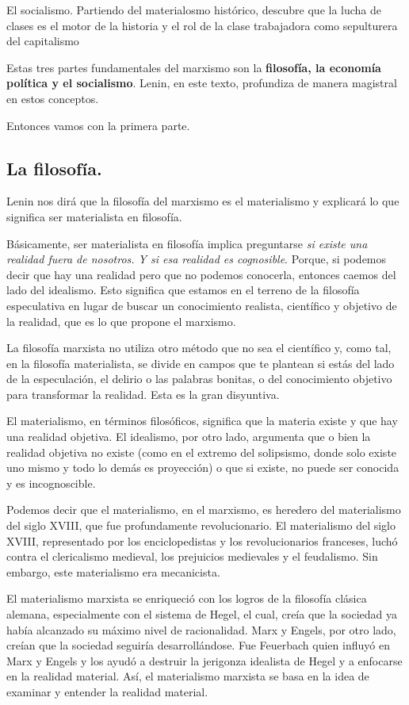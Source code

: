 \documentclass[
  jou,
  floatsintext,
  longtable,
  a4paper,
  nolmodern,
  notxfonts,
  notimes,
  12pt,
  colorlinks=true,linkcolor=blue,citecolor=blue,urlcolor=blue]{apa7}
\begin{document}
El socialismo. Partiendo del materialosmo histórico, descubre que la
lucha de clases es el motor de la historia y el rol de la clase
trabajadora como sepulturera del capitalismo

Estas tres partes fundamentales del marxismo son la \textbf{filosofía,
la economía política y el socialismo}. Lenin, en este texto, profundiza
de manera magistral en estos conceptos.

Entonces vamos con la primera parte.

\subsection{La filosofía.}\label{la-filosofuxeda.}

Lenin nos dirá que la filosofía del marxismo es el materialismo y
explicará lo que significa ser materialista en filosofía.

Básicamente, ser materialista en filosofía implica preguntarse \emph{si
existe una realidad fuera de nosotros. Y si esa realidad es cognosible}.
Porque, si podemos decir que hay una realidad pero que no podemos
conocerla, entonces caemos del lado del idealismo. Esto significa que
estamos en el terreno de la filosofía especulativa en lugar de buscar un
conocimiento realista, científico y objetivo de la realidad, que es lo
que propone el marxismo.

La filosofía marxista no utiliza otro método que no sea el científico y,
como tal, en la filosofía materialista, se divide en campos que te
plantean si estás del lado de la especulación, el delirio o las palabras
bonitas, o del conocimiento objetivo para transformar la realidad. Esta
es la gran disyuntiva.

El materialismo, en términos filosóficos, significa que la materia
existe y que hay una realidad objetiva. El idealismo, por otro lado,
argumenta que o bien la realidad objetiva no existe (como en el extremo
del solipsismo, donde solo existe uno mismo y todo lo demás es
proyección) o que si existe, no puede ser conocida y es incognoscible.

Podemos decir que el materialismo, en el marxismo, es heredero del
materialismo del siglo XVIII, que fue profundamente revolucionario. El
materialismo del siglo XVIII, representado por los enciclopedistas y los
revolucionarios franceses, luchó contra el clericalismo medieval, los
prejuicios medievales y el feudalismo. Sin embargo, este materialismo
era mecanicista.

El materialismo marxista se enriqueció con los logros de la filosofía
clásica alemana, especialmente con el sistema de Hegel, el cual, creía
que la sociedad ya había alcanzado su máximo nivel de racionalidad. Marx
y Engels, por otro lado, creían que la sociedad seguiría
desarrollándose. Fue Feuerbach quien influyó en Marx y Engels y los
ayudó a destruir la jerigonza idealista de Hegel y a enfocarse en la
realidad material. Así, el materialismo marxista se basa en la idea de
examinar y entender la realidad material.
\end{document}
